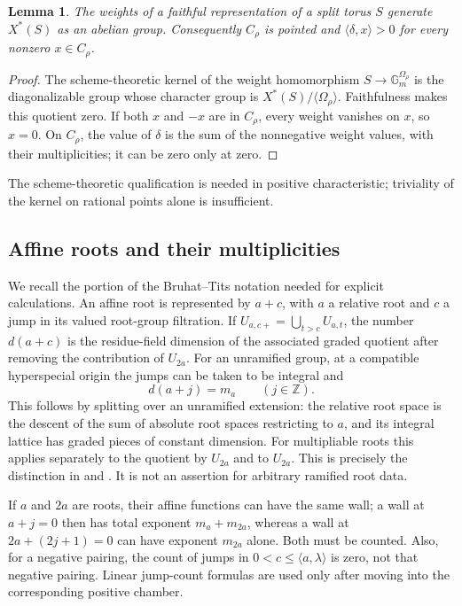\documentclass[11pt,a4paper]{article}
\newtheorem{lemma}[proposition]{Lemma}
\theoremstyle{definition}
\newcommand{\Z}{\mathbb Z}
\newcommand{\Gm}{\mathbb G_m}
\begin{document}
\begin{lemma}\label{lem:weights}
The weights of a faithful representation of a split torus $S$ generate
$X^*(S)$ as an abelian group. Consequently $C_\rho$ is pointed and
$\langle\delta,x\rangle>0$ for every nonzero $x\in C_\rho$.
\end{lemma}
\begin{proof}
The scheme-theoretic kernel of the weight homomorphism
$S\to\Gm^{\Omega_\rho}$ is the diagonalizable group whose character
group is $X^*(S)/\langle\Omega_\rho\rangle$. Faithfulness makes this
quotient zero. If both $x$ and $-x$ are in $C_\rho$, every weight
vanishes on $x$, so $x=0$. On $C_\rho$, the value of $\delta$ is the
sum of the nonnegative weight values, with their multiplicities; it
can be zero only at zero.
\end{proof}
The scheme-theoretic qualification is needed in positive characteristic;
triviality of the kernel on rational points alone is insufficient.

\subsection{Affine roots and their multiplicities}
We recall the portion of the Bruhat--Tits notation needed for explicit
calculations. An affine root is represented by $a+c$, with $a$ a
relative root and $c$ a jump in its valued root-group filtration. If
$U_{a,c+}=\bigcup_{t>c}U_{a,t}$, the number $d(a+c)$ is the
residue-field dimension of the associated graded quotient after removing
the contribution of $U_{2a}$. For an unramified group, at a compatible
hyperspecial origin the jumps can be taken to be integral and
\begin{equation}\label{eq:periodic}
 d(a+j)=m_a\qquad(j\in\Z).
\end{equation}
This follows by splitting over an unramified extension: the relative
root space is the descent of the sum of absolute root spaces restricting
to $a$, and its integral lattice has graded pieces of constant dimension.
For multipliable roots this applies separately to the quotient by
$U_{2a}$ and to $U_{2a}$. This is precisely the distinction in
\cite[\S\S1.4--1.8, 1.15]{Tits} and \cite[\S4.2]{BT2}.
It is not an assertion for arbitrary ramified root data.

If $a$ and $2a$ are roots, their affine functions can have the same
wall; a wall at $a+j=0$ then has total exponent $m_a+m_{2a}$,
whereas a wall at $2a+(2j+1)=0$ can have exponent $m_{2a}$ alone.
Both must be counted. Also, for a negative pairing, the count of jumps
in $0<c\leq\langle a,\lambda\rangle$ is zero, not that negative
pairing. Linear jump-count formulas are used only after moving into
the corresponding positive chamber.
\end{document}
